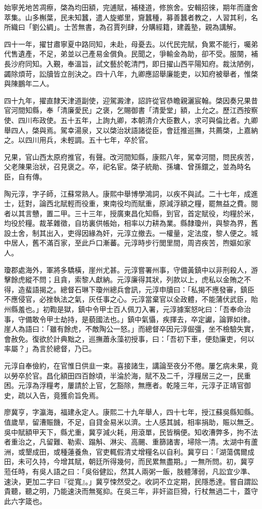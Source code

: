 \begin{pinyinscope}
始寧羌地苦凋瘵，棨為均田額，完逋賦，補棧道，修旅舍。安輯招徠，期年而廬舍萃集。山多槲葉，民未知蠶，遣人旋鄉里，齎蠶種，募善蠶者教之，人習其利，名所織曰「劉公綢」。士苦無書，為召賈列肆，分購經籍，建義塾，親為講解。

四十一年，擢甘肅寧夏中路同知，未赴，母憂去。以代民完賦，負累不能行，囑弟代售遺產，不足，弟並以己產易金償負。民聞之，爭輸金為助，卻不受。服闋，補長沙府同知。入覲，奉溫旨，試文藝於乾清門，即日擢山西平陽知府。裁汰陋例，蠲除煩苛，訟牘皆立剖決之。四十八年，九卿應詔舉廉能吏，以知府被舉者，惟棨與陳鵬年二人。

四十九年，擢直隸天津道副使，迎駕澱津，詔許從官恭瞻親灑宸翰。棨因奏兄果昔官河間知縣，奉「清廉愛民」之褒，乞賜御書「清愛堂」額，上允之。歷江西按察使、四川布政使。五十五年，上詢九卿，本朝清介大臣數人，求可與倫比者。九卿舉四人，棨與焉。駕幸湯泉，又以棨治狀語諸從臣，會廷推巡撫，共薦棨，上嘉納之。以四川用兵，未輕調。五十七年，卒於官。

兄果，官山西太原府推官，有聲。改河間知縣，康熙八年，駕幸河間，問民疾苦，父老陳果治狀，召見褒之。卒，祀名宦。棨子統勛、孫墉、曾孫鐶之，並為時名臣，自有傳。

陶元淳，字子師，江蘇常熟人。康熙中舉博學鴻詞，以疾不與試。二十七年，成進士，廷對，論西北賦輕而役重，東南役均而賦重，原減浮額之糧，罷無益之費。閱者以其言戇，置二甲。三十三年，授廣東昌化知縣，到官，首定賦役，均糧於米，均役於糧。裁革雜徵，自坊裏供帳始，相率以力耕為業。縣隸瓊州，與黎為界，舊設土舍，制其出入，吏得因緣為奸，元淳立撤去。一權量，定法度，黎人便之。城中居人，舊不滿百家，至此戶口漸蕃。元淳時步行閭里間，周咨疾苦，煦嫗如家人。

瓊郡處海外，軍將多驕橫，崖州尤甚。元淳嘗署州事，守備黃鎮中以非刑殺人，游擊餘虎縱不問；且貪，索黎人獻納。元淳廉得其狀，列款以上，虎私以金賄之不得，造蜚語揭之。總督石琳下瓊州總兵會訊，元淳申牘曰：「私揭不應發審，鎮臣不應侵官，必挫執法之氣，灰任事之心。元淳當棄官以全政體，不能蒲伏武臣，貽州縣羞也。」初鞫是獄，鎮中令甲士百人佩刀入署，元淳據案怒叱曰：「吾奉命治事，守備敢令甲士劫持，是藐國法也。」鎮中氣懾，疾揮去，卒定讞，論罪如律。崖人為語曰：「雖有餘虎，不敵陶公一怒。」而總督卒因元淳倔彊，坐不檢驗失實，會赦免。復欲於計典黜之，巡撫蕭永藻初授事，曰：「吾初下車，便劾廉吏，何以率屬？」為言於總督，乃已。

元淳自奉儉約，在官惟日供韭一束。喜接諸生，講論至夜分不倦。屢乞病未果，竟以勞卒於官。昌化額田四百餘頃，半淪於海，賦不及二千，浮糧居三之一，民重困。元淳為浮糧考，屢請於上官，乞豁除，無應者。乾隆三年，元淳子正靖官御史，疏以入告，竟獲俞旨免焉。

廖冀亨，字瀛海，福建永定人。康熙二十九年舉人，四十七年，授江蘇吳縣知縣。值歲旱，留漕賑饑，不足，自貸金易米以濟。士人感其誠，相率捐助，賑以無乏。吳中賦額甲天下，縣尤重，冀亨減火耗，用滾單，民皆稱便。知收漕弊多，拘不法者重治之，凡留難、勒索、蹋斛、淋尖、高颺、重篩諸害，埽除一清。太湖中有蘆洲，或墾成田，或種蓮養魚，官吏輒假清丈增糧名以自利。冀亨曰：「湖蕩偶爾成田，未可久持，今增其賦，朝廷所得幾何，而民累無盡期。」一無所問。初，冀亨蒞任時，有吳人語之曰：「吳俗健訟，然其人兩粥一飯，肢體薄弱，凡訟宜少準、速決，更加二字曰『從寬』。」冀亨悚然受之。收詞不立定期，民隱悉達。嘗自謂訟貴聽，聽之明，乃能速決而無冤抑。在吳三年，非奸盜巨猾，行杖無過二十，蓋守此六字箴也。


\end{pinyinscope}
